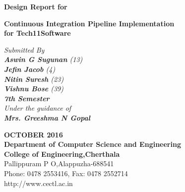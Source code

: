 \documentclass[12pt,a4paper,oneside]{report}
\begin{document}
\renewcommand\bibname{References}
\begin{titlepage}
\begin{center}
\large{\textbf{Design Report for}}\\
\begin{singlespace}
\LARGE{\textbf{Continuous Integration Pipeline Implementation \\ for
Tech11Software
}}\\
\end{singlespace}
\Large{\textit{Submitted By }}\\
\Large{\textit{\textbf{Aswin G Sugunan}     (13)}}\\
\Large{\textit{\textbf{Jefin Jacob}    (4)}}\\
\Large{\textit{\textbf{Nitin Suresh}   (23)}}\\
\Large{\textit{\textbf{Vishnu Bose}   (39)}}\\
\Large{\textit{\textbf{7th Semester}   }}\\

\Large{\textit{\textit{Under the guidance of}}}\\
\Large{\textit{\textbf{Mrs. Greeshma N Gopal }}}\\
\vspace{.05in}

\vspace{.05in}
\begin{figure}[h]
\begin{center}
\end{center}
\end{figure}
\begin{singlespace}
\end{singlespace}
\begin{singlespace}
\Large{\textbf{OCTOBER 2016\\Department of Computer Science and Engineering\\College of Engineering,Cherthala}\\Pallippuram P O,Alappuzha-688541\\Phone: 0478 2553416, Fax: 0478 2552714\\http://www.cectl.ac.in}
\end{singlespace}
\end{center}
\end{titlepage}
\end{document}
